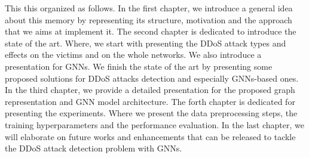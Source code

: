 This this organized as follows. In the first chapter, we introduce a general idea about this memory by representing its structure, motivation and the approach that we aims at implement it.
The second chapter is dedicated to introduce the state of the art. Where, we start with presenting the DDoS attack types and effects on the victims and on the whole networks. We also introduce a presentation for GNNs. We finish the state of the art by presenting some proposed solutions for DDoS attacks detection and especially GNNs-based ones. 
In the third chapter, we provide a detailed presentation for the proposed graph representation and GNN model architecture. The forth chapter is dedicated for presenting the experiments. Where we present the data preprocessing steps, the training hyperparameters and the performance evaluation.
In the last chapter, we will elaborate on future works and enhancements that can be released to tackle the DDoS attack detection problem with GNNs.